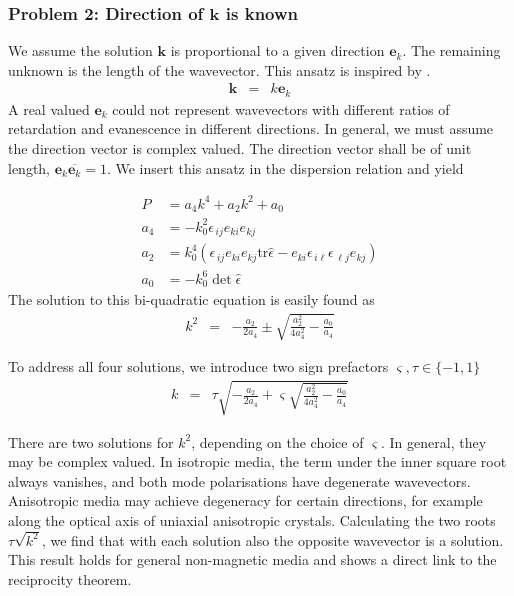 \documentclass[12pt,a4paper,twoside,openright,BCOR10mm,headsepline,titlepage,abstracton,chapterprefix,final]{scrreprt}
\newcommand\Vector[1]{{\mathbf{#1}}}
\newcommand\wavenumber{k}
\newcommand\Wavevector{\Vector{\wavenumber}}
\newcommand\Tensor[1]{\hat{#1}}
\newcommand\scalarrelativepermittivity{\epsilon}
\newcommand\relativepermittivity{\Tensor{\scalarrelativepermittivity}}
\newcommand\tr{\text{tr}}
\begin{document}
\subsubsection{Problem 2: Direction of $\Wavevector$ is known}
We assume the solution $\Wavevector$ is proportional to a given direction $\Vector{e}_\wavenumber$.
The remaining unknown is the length of the wavevector. This ansatz is inspired by \cite{Doering:1957, wiki:Kristalloptik}.
\begin{eqnarray}
 \Wavevector &=& \wavenumber \Vector{e}_\wavenumber
\end{eqnarray}
A real valued $\Vector{e}_\wavenumber$ could not represent wavevectors with different ratios of retardation and evanescence in different directions.
In general, we must assume the direction vector is complex valued.
The direction vector shall be of unit length, $\Vector{e}_\wavenumber \overline{\Vector{e}_\wavenumber} = 1$.
We insert this ansatz in the dispersion relation and yield

\begin{align}
 P &= a_4 \wavenumber^4 + a_2 \wavenumber^2 + a_0
 \\
 a_4 &= - k_0^2 \scalarrelativepermittivity_{\,ij} e_{ki} e_{kj}
 \\
 a_2 &=   k_0^4 ( \scalarrelativepermittivity_{\,ij} e_{ki} e_{kj} \tr\relativepermittivity - e_{ki} \scalarrelativepermittivity_{\,i\ell} \scalarrelativepermittivity_{\,\ell j} e_{kj})
 \\
 a_0 &= - k_0^6 \det \relativepermittivity
\end{align}
The solution to this bi-quadratic equation is easily found as
\begin{eqnarray}
 \wavenumber^2 &=& - \frac{a_2}{2 a_4} \pm \sqrt{\frac{a_2^2}{4 a_4^2} - \frac{a_0}{a_4}} 
\end{eqnarray}

To address all four solutions, we introduce two sign prefactors $\varsigma, \tau \in \{ -1,1\}$
\begin{eqnarray}
 \wavenumber &=& \tau \sqrt{ - \frac{a_2}{2 a_4} + \varsigma \sqrt{\frac{a_2^2}{4 a_4^2} - \frac{a_0}{a_4}} } \label{eq:dispersion_for_known_direction}
\end{eqnarray}

There are two solutions for $\wavenumber^2$, depending on the choice of $\varsigma$.
In general, they may be complex valued.
In isotropic media, the term under the inner square root always vanishes, and both mode polarisations have degenerate wavevectors.
Anisotropic media may achieve degeneracy for certain directions, 
for example along the optical axis of uniaxial anisotropic crystals.
Calculating the two roots $\tau \sqrt{\wavenumber^2}$, we find that with each solution
also the opposite wavevector is a solution.
This result holds for general non-magnetic media and shows a direct link to the reciprocity theorem.
\end{document}
